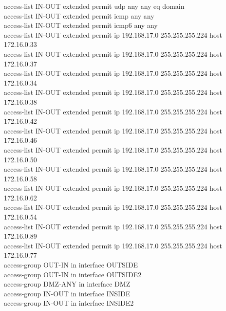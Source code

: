 \documentclass[a4paper, 12pt]{article}
\begin{document}
{\hspace*{1cm}access-list IN-OUT extended permit udp any any eq domain\\
\hspace*{1cm}access-list IN-OUT extended permit icmp any any\\
\hspace*{1cm}access-list IN-OUT extended permit icmp6 any any\\
\hspace*{1cm}access-list IN-OUT extended permit ip 192.168.17.0 255.255.255.224 host 172.16.0.33\\
\hspace*{1cm}access-list IN-OUT extended permit ip 192.168.17.0 255.255.255.224 host 172.16.0.37\\
\hspace*{1cm}access-list IN-OUT extended permit ip 192.168.17.0 255.255.255.224 host 172.16.0.34\\
\hspace*{1cm}access-list IN-OUT extended permit ip 192.168.17.0 255.255.255.224 host 172.16.0.38\\
\hspace*{1cm}access-list IN-OUT extended permit ip 192.168.17.0 255.255.255.224 host 172.16.0.42\\
\hspace*{1cm}access-list IN-OUT extended permit ip 192.168.17.0 255.255.255.224 host 172.16.0.46\\
\hspace*{1cm}access-list IN-OUT extended permit ip 192.168.17.0 255.255.255.224 host 172.16.0.50\\
\hspace*{1cm}access-list IN-OUT extended permit ip 192.168.17.0 255.255.255.224 host 172.16.0.58\\
\hspace*{1cm}access-list IN-OUT extended permit ip 192.168.17.0 255.255.255.224 host 172.16.0.62\\
\hspace*{1cm}access-list IN-OUT extended permit ip 192.168.17.0 255.255.255.224 host 172.16.0.54\\
\hspace*{1cm}access-list IN-OUT extended permit ip 192.168.17.0 255.255.255.224 host 172.16.0.89\\
\hspace*{1cm}access-list IN-OUT extended permit ip 192.168.17.0 255.255.255.224 host 172.16.0.77\\
\hspace*{1cm}access-group OUT-IN in interface OUTSIDE\\
\hspace*{1cm}access-group OUT-IN in interface OUTSIDE2\\
\hspace*{1cm}access-group DMZ-ANY in interface DMZ\\
\hspace*{1cm}access-group IN-OUT in interface INSIDE\\
\hspace*{1cm}access-group IN-OUT in interface INSIDE2\\}
\end{document}
